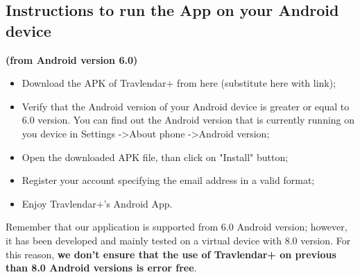 \subsection{Instructions to run the App on your Android device}
\label{subsect:Android device Instructions}
\textbf{(from Android version 6.0)}
\begin{itemize}
	\item Download the APK of Travlendar+ from here (substitute here with link); 
	\item Verify that the Android version of your Android device is greater or equal to 6.0 version. You can find out the Android version that is currently running on you device in Settings -\textgreater  About phone -\textgreater  Android version;
	\item Open the downloaded APK file, than click on "Install" button;
	\item Register your account specifying the email address in a valid format;
	\item Enjoy Travlendar+'s Android App.	\\
\end{itemize}
Remember that our application is supported from 6.0 Android version; however, it has been developed and mainly tested on a virtual device with 8.0 version. For this reason, \textbf{we don't ensure that the use of Travlendar+ on previous than 8.0 Android versions is error free}.